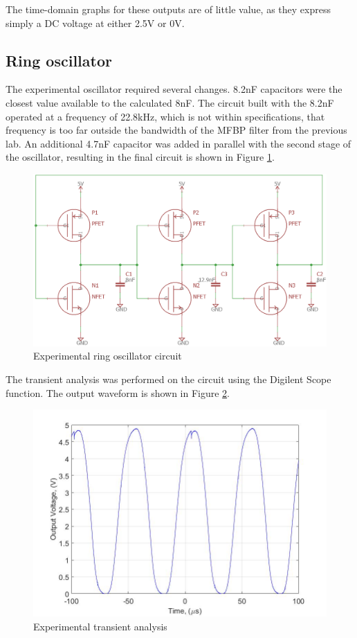 The time-domain graphs for these outputs are of little value, as they express simply a DC voltage at either 2.5V or 0V. 

\subsection{Ring oscillator}
The experimental oscillator required several changes. 8.2nF capacitors were the closest value available to the calculated 8nF. The circuit built with the 8.2nF operated at a frequency of 22.8kHz, which is not within specifications, that frequency is too far outside the bandwidth of the MFBP filter from the previous lab. An additional 4.7nF capacitor was added in parallel with the second stage of the oscillator, resulting in the final circuit is shown in Figure \ref{fig:expring}.

\begin{figure}[H]
    \centering
    \includegraphics[width=.7\textwidth]{ExperimentalImplementation/RingOscillatorCMOSexp.png}
    \caption{Experimental ring oscillator circuit}
    \label{fig:expring}
\end{figure}

The transient analysis was performed on the circuit using the Digilent Scope function. The output waveform is shown in Figure \ref{fig:ringoutput}.

\begin{figure}[H]
    \centering
    \includegraphics[width=.6\textwidth]{ExperimentalImplementation/ring_oscillator_output.jpg}
    \caption{Experimental transient analysis}
    \label{fig:ringoutput}
\end{figure}


